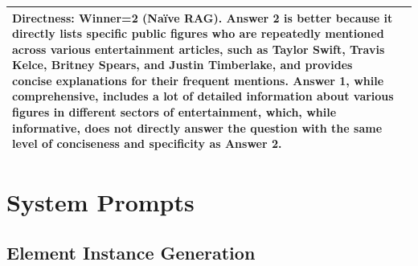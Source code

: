 \documentclass{article}
\begin{document}
\begin{table}[h]
\begin{tabular}{>{\raggedright\arraybackslash}p{}>{\raggedright\arraybackslash}p{}}
\vspace*{2mm}
\newline
\textbf{Directness: Winner=2 (Na\"ive RAG)}. Answer 2 is better because it directly lists specific public figures who are repeatedly mentioned across various entertainment articles, such as Taylor Swift, Travis Kelce, Britney Spears, and Justin Timberlake, and provides concise explanations for their frequent mentions. Answer 1, while comprehensive, includes a lot of detailed information about various figures in different sectors of entertainment, which, while informative, does not directly answer the question with the same level of conciseness and specificity as Answer 2.\vspace*{2mm}\\ \hline
    \end{tabular}
    \label{tab:example_assessment}
\end{table}


\raggedbottom

\pagebreak
\section{System Prompts}
\label{app:sys_prompts}


\subsection{Element Instance Generation}
\end{document}
